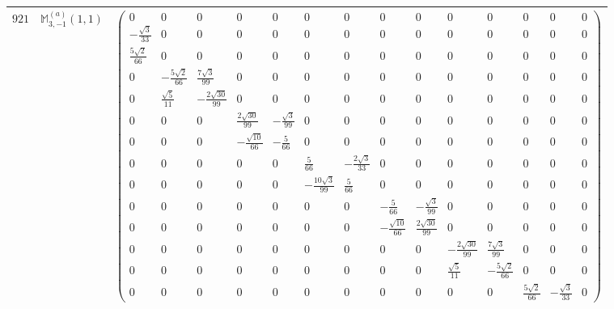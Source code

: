 \documentclass[fleqn,8pt,landscape]{jsarticle}
\begin{document}
\begin{center}
\begin{longtable}{ccc}
$ 921 $ & $ \mathbb{M}_{3,-1}^{(a)}(1,1) $ & $ \begin{pmatrix} 0 & 0 & 0 & 0 & 0 & 0 & 0 & 0 & 0 & 0 & 0 & 0 & 0 & 0 \\ - \frac{\sqrt{3}}{33} & 0 & 0 & 0 & 0 & 0 & 0 & 0 & 0 & 0 & 0 & 0 & 0 & 0 \\ \frac{5 \sqrt{2}}{66} & 0 & 0 & 0 & 0 & 0 & 0 & 0 & 0 & 0 & 0 & 0 & 0 & 0 \\ 0 & - \frac{5 \sqrt{2}}{66} & \frac{7 \sqrt{3}}{99} & 0 & 0 & 0 & 0 & 0 & 0 & 0 & 0 & 0 & 0 & 0 \\ 0 & \frac{\sqrt{5}}{11} & - \frac{2 \sqrt{30}}{99} & 0 & 0 & 0 & 0 & 0 & 0 & 0 & 0 & 0 & 0 & 0 \\ 0 & 0 & 0 & \frac{2 \sqrt{30}}{99} & - \frac{\sqrt{3}}{99} & 0 & 0 & 0 & 0 & 0 & 0 & 0 & 0 & 0 \\ 0 & 0 & 0 & - \frac{\sqrt{10}}{66} & - \frac{5}{66} & 0 & 0 & 0 & 0 & 0 & 0 & 0 & 0 & 0 \\ 0 & 0 & 0 & 0 & 0 & \frac{5}{66} & - \frac{2 \sqrt{3}}{33} & 0 & 0 & 0 & 0 & 0 & 0 & 0 \\ 0 & 0 & 0 & 0 & 0 & - \frac{10 \sqrt{3}}{99} & \frac{5}{66} & 0 & 0 & 0 & 0 & 0 & 0 & 0 \\ 0 & 0 & 0 & 0 & 0 & 0 & 0 & - \frac{5}{66} & - \frac{\sqrt{3}}{99} & 0 & 0 & 0 & 0 & 0 \\ 0 & 0 & 0 & 0 & 0 & 0 & 0 & - \frac{\sqrt{10}}{66} & \frac{2 \sqrt{30}}{99} & 0 & 0 & 0 & 0 & 0 \\ 0 & 0 & 0 & 0 & 0 & 0 & 0 & 0 & 0 & - \frac{2 \sqrt{30}}{99} & \frac{7 \sqrt{3}}{99} & 0 & 0 & 0 \\ 0 & 0 & 0 & 0 & 0 & 0 & 0 & 0 & 0 & \frac{\sqrt{5}}{11} & - \frac{5 \sqrt{2}}{66} & 0 & 0 & 0 \\ 0 & 0 & 0 & 0 & 0 & 0 & 0 & 0 & 0 & 0 & 0 & \frac{5 \sqrt{2}}{66} & - \frac{\sqrt{3}}{33} & 0 \end{pmatrix} $ \\ \hline

\end{longtable}
\end{center}
\end{document}
